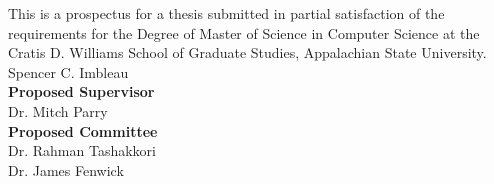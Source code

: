\vspace*{\fill}
\begin{center}
\title{\Large\thesistitle}
\vfill
This is a prospectus for a thesis submitted in partial satisfaction of the requirements for the Degree of Master of Science in Computer Science at the Cratis D. Williams School of Graduate Studies, Appalachian State University.
\vfill
Spencer C. Imbleau\\
\medskip
\textbf{Proposed Supervisor}\\
Dr. Mitch Parry\\
\medskip
\textbf{Proposed Committee}\\
Dr. Rahman Tashakkori\\
Dr. James Fenwick
\end{center}
\vfill %